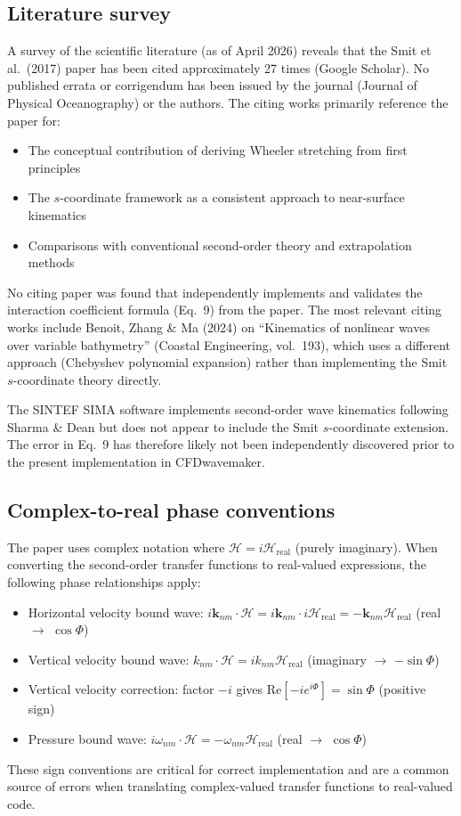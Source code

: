 \documentclass{ol-softwaremanual}
\begin{document}
\subsection{Literature survey}
\label{app:literature}

A survey of the scientific literature (as of April 2026) reveals that the Smit et al.\ (2017) paper has been cited approximately 27 times (Google Scholar). No published errata or corrigendum has been issued by the journal (Journal of Physical Oceanography) or the authors. The citing works primarily reference the paper for:
\begin{itemize}
    \item The conceptual contribution of deriving Wheeler stretching from first principles
    \item The $s$-coordinate framework as a consistent approach to near-surface kinematics
    \item Comparisons with conventional second-order theory and extrapolation methods
\end{itemize}
No citing paper was found that independently implements and validates the interaction coefficient formula (Eq.~9) from the paper. The most relevant citing works include Benoit, Zhang \& Ma (2024) on ``Kinematics of nonlinear waves over variable bathymetry'' (Coastal Engineering, vol.~193), which uses a different approach (Chebyshev polynomial expansion) rather than implementing the Smit $s$-coordinate theory directly.

The SINTEF SIMA software implements second-order wave kinematics following Sharma \& Dean but does not appear to include the Smit $s$-coordinate extension. The error in Eq.~9 has therefore likely not been independently discovered prior to the present implementation in CFDwavemaker.

\subsection{Complex-to-real phase conventions}

The paper uses complex notation where $\mathscr{H} = i\mathscr{H}_\mathrm{real}$ (purely imaginary). When converting the second-order transfer functions to real-valued expressions, the following phase relationships apply:
\begin{itemize}
    \item Horizontal velocity bound wave: $i\mathbf{k}_{nm}\cdot\mathscr{H} = i\mathbf{k}_{nm}\cdot i\mathscr{H}_\mathrm{real} = -\mathbf{k}_{nm}\mathscr{H}_\mathrm{real}$ (real $\to$ $\cos\Phi$)
    \item Vertical velocity bound wave: $k_{nm}\cdot\mathscr{H} = ik_{nm}\mathscr{H}_\mathrm{real}$ (imaginary $\to$ $-\sin\Phi$)
    \item Vertical velocity correction: factor $-i$ gives $\mathrm{Re}[-ie^{i\Phi}] = \sin\Phi$ (positive sign)
    \item Pressure bound wave: $i\omega_{nm}\cdot\mathscr{H} = -\omega_{nm}\mathscr{H}_\mathrm{real}$ (real $\to$ $\cos\Phi$)
\end{itemize}

These sign conventions are critical for correct implementation and are a common source of errors when translating complex-valued transfer functions to real-valued code.

\printbibliography
\end{document}
